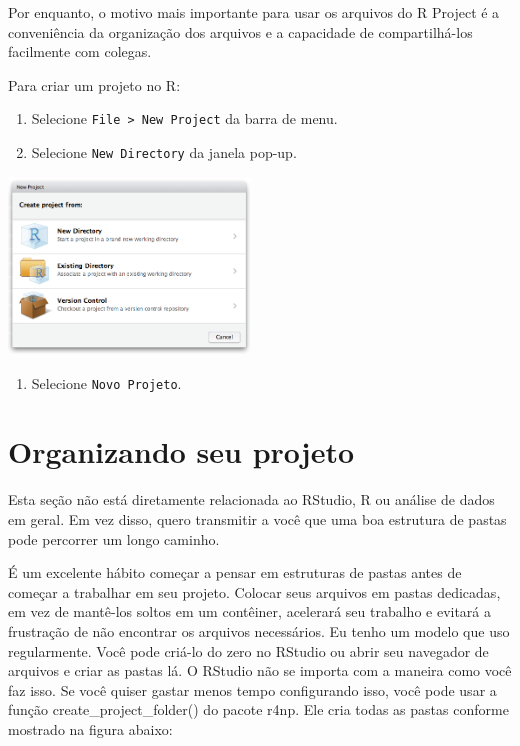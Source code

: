 \documentclass[
]{book}
\providecommand{\tightlist}{%
  \setlength{\itemsep}{0pt}\setlength{\parskip}{0pt}}
\begin{document}
Por enquanto, o motivo mais importante para usar os arquivos do R Project é a conveniência da organização dos arquivos e a capacidade de compartilhá-los facilmente com colegas.

Para criar um projeto no R:

\begin{enumerate}
\def\labelenumi{\arabic{enumi}.}
\item
  Selecione \texttt{File\ \textgreater{}\ New\ Project} da barra de menu.
\item
  Selecione \texttt{New\ Directory} da janela pop-up.
\end{enumerate}

\begin{center}\includegraphics[width=2.53in]{figuras/projects_new} \end{center}

\begin{enumerate}
\def\labelenumi{\arabic{enumi}.}
\setcounter{enumi}{2}
\tightlist
\item
  Selecione \texttt{Novo\ Projeto}.
\end{enumerate}

\hypertarget{organizando-seu-projeto}{%
\section{Organizando seu projeto}\label{organizando-seu-projeto}}

Esta seção não está diretamente relacionada ao RStudio, R ou análise de dados em geral. Em vez disso, quero transmitir a você que uma boa estrutura de pastas pode percorrer um longo caminho.

É um excelente hábito começar a pensar em estruturas de pastas antes de começar a trabalhar em seu projeto. Colocar seus arquivos em pastas dedicadas, em vez de mantê-los soltos em um contêiner, acelerará seu trabalho e evitará a frustração de não encontrar os arquivos necessários. Eu tenho um modelo que uso regularmente. Você pode criá-lo do zero no RStudio ou abrir seu navegador de arquivos e criar as pastas lá. O RStudio não se importa com a maneira como você faz isso. Se você quiser gastar menos tempo configurando isso, você pode usar a função create\_project\_folder() do pacote r4np. Ele cria todas as pastas conforme mostrado na figura abaixo:
\end{document}

